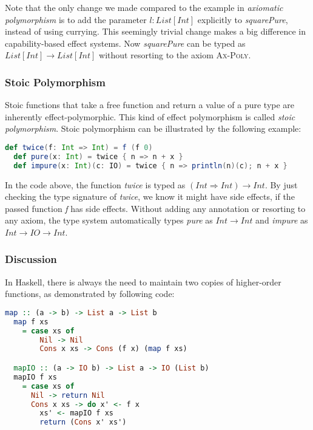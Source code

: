 Note that the only change we made compared to the example in
\emph{axiomatic polymorphism} is to add the parameter $l: List[Int]$
explicitly to \emph{squarePure}, instead of using currying. This
seemingly trivial change makes a big difference in capability-based
effect systems. Now \emph{squarePure} can be typed as
$List[Int] \to List[Int]$ without resorting to the axiom
\textsc{Ax-Poly}.

\subsubsection{Stoic Polymorphism}

Stoic functions that take a free function and return a value of a pure
type are inherently effect-polymorphic. This kind of effect
polymorphism is called \emph{stoic polymorphism}.  Stoic polymorphism
can be illustrated by the following example:

\begin{lstlisting}[language=Scala]
  def twice(f: Int => Int) = f (f 0)
  def pure(x: Int) = twice { n => n + x }
  def impure(x: Int)(c: IO) = twice { n => println(n)(c); n + x }
\end{lstlisting}

In the code above, the function \emph{twice} is typed as
$(Int \Rightarrow Int) \to Int$. By just checking the type signature
of \emph{twice}, we know it might have side effects, if the passed
function \emph{f} has side effects. Without adding any annotation or
resorting to any axiom, the type system automatically types
\emph{pure} as $Int \to Int$ and \emph{impure} as
$Int \to IO \to Int$.

\subsubsection{Discussion}

In Haskell, there is always the need to maintain two copies of
higher-order functions, as demonstrated by following code:

\begin{lstlisting}[language=Haskell]
  map :: (a -> b) -> List a -> List b
  map f xs
    = case xs of
        Nil -> Nil
        Cons x xs -> Cons (f x) (map f xs)

  mapIO :: (a -> IO b) -> List a -> IO (List b)
  mapIO f xs
    = case xs of
      Nil -> return Nil
      Cons x xs -> do x' <- f x
        xs' <- mapIO f xs
        return (Cons x' xs')
\end{lstlisting}


